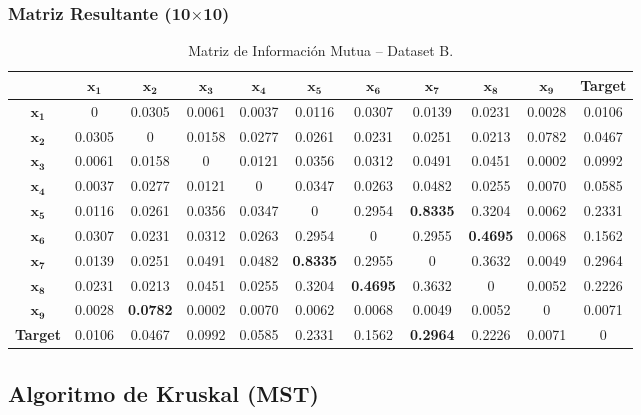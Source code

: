 \documentclass[12pt,a4paper]{article}
\begin{document}
\subsubsection{Matriz Resultante (10$\times$10)}

\begin{table}[H]
    \centering
    \footnotesize
    \begin{tabular}{c|cccccccccc}
        \toprule
        & $\mathbf{x_1}$ & $\mathbf{x_2}$ & $\mathbf{x_3}$ & $\mathbf{x_4}$ & $\mathbf{x_5}$ & $\mathbf{x_6}$ & $\mathbf{x_7}$ & $\mathbf{x_8}$ & $\mathbf{x_9}$ & \textbf{Target} \\
        \midrule
        $\mathbf{x_1}$ & 0 & 0.0305 & 0.0061 & 0.0037 & 0.0116 & 0.0307 & 0.0139 & 0.0231 & 0.0028 & 0.0106 \\
        $\mathbf{x_2}$ & 0.0305 & 0 & 0.0158 & 0.0277 & 0.0261 & 0.0231 & 0.0251 & 0.0213 & 0.0782 & 0.0467 \\
        $\mathbf{x_3}$ & 0.0061 & 0.0158 & 0 & 0.0121 & 0.0356 & 0.0312 & 0.0491 & 0.0451 & 0.0002 & 0.0992 \\
        $\mathbf{x_4}$ & 0.0037 & 0.0277 & 0.0121 & 0 & 0.0347 & 0.0263 & 0.0482 & 0.0255 & 0.0070 & 0.0585 \\
        $\mathbf{x_5}$ & 0.0116 & 0.0261 & 0.0356 & 0.0347 & 0 & 0.2954 & \textbf{0.8335} & 0.3204 & 0.0062 & 0.2331 \\
        $\mathbf{x_6}$ & 0.0307 & 0.0231 & 0.0312 & 0.0263 & 0.2954 & 0 & 0.2955 & \textbf{0.4695} & 0.0068 & 0.1562 \\
        $\mathbf{x_7}$ & 0.0139 & 0.0251 & 0.0491 & 0.0482 & \textbf{0.8335} & 0.2955 & 0 & 0.3632 & 0.0049 & 0.2964 \\
        $\mathbf{x_8}$ & 0.0231 & 0.0213 & 0.0451 & 0.0255 & 0.3204 & \textbf{0.4695} & 0.3632 & 0 & 0.0052 & 0.2226 \\
        $\mathbf{x_9}$ & 0.0028 & \textbf{0.0782} & 0.0002 & 0.0070 & 0.0062 & 0.0068 & 0.0049 & 0.0052 & 0 & 0.0071 \\
        \textbf{Target} & 0.0106 & 0.0467 & 0.0992 & 0.0585 & 0.2331 & 0.1562 & \textbf{0.2964} & 0.2226 & 0.0071 & 0 \\
        \bottomrule
    \end{tabular}
    \caption{Matriz de Información Mutua -- Dataset B.}
\end{table}

\subsection{Algoritmo de Kruskal (MST)}
\end{document}
